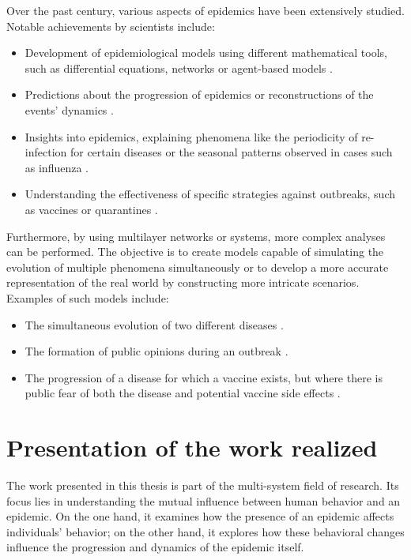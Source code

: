 Over the past century, various aspects of epidemics have been extensively studied. Notable achievements by scientists include:
\begin{itemize}
	\item Development of epidemiological models using different mathematical tools, such as differential equations, networks or agent-based models \cite{Hernandez_Vargas_2022, Keeling_2005}.
	\item Predictions about the progression of epidemics or reconstructions of the events' dynamics \cite{diekmann2000mathematical, brauer2012mathematical, Ledder_2023}.
	\item Insights into epidemics, explaining phenomena like the periodicity of re-infection for certain diseases or the seasonal patterns observed in cases such as influenza \cite{Bjoernstad2016}.
	\item Understanding the effectiveness of specific strategies against outbreaks, such as vaccines or quarantines \cite{Wang_2015_review}.
\end{itemize}
Furthermore, by using multilayer networks or systems, more complex analyses can be performed. The objective is to create models capable of simulating the evolution of multiple phenomena simultaneously or to develop a more accurate representation of the real world by constructing more intricate scenarios. Examples of such models include:
\begin{itemize}
	\item The simultaneous evolution of two different diseases \cite{DeDomenico2016}.
	\item The formation of public opinions during an outbreak \cite{teslya2022}.
	\item The progression of a disease for which a vaccine exists, but where there is public fear of both the disease and potential vaccine side effects \cite{Epstein_2021}.
\end{itemize}

\section{Presentation of the work realized}
The work presented in this thesis is part of the multi-system field of research. Its focus lies in understanding the mutual influence between human behavior and an epidemic. On the one hand, it examines how the presence of an epidemic affects individuals' behavior; on the other hand, it explores how these behavioral changes influence the progression and dynamics of the epidemic itself.

